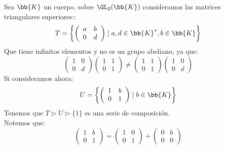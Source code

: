 \begin{ejemplo}
    Sea $\bb{K}$ un cuerpo, sobre $\GL_2(\bb{K})$ consideramos las matrices triangulares superiores::
    \begin{equation*}
        T = \left\{\left(\begin{array}{cc}
            a & b \\
            0 & d 
        \end{array}\right) \mid a,d\in \bb{K}^\ast, b\in \bb{K}\right\}
    \end{equation*}
    Que tiene infinitos elementos y no es un grupo abeliano, ya que:
    \begin{equation*}
        \left(\begin{array}{cc}
            1 & 0 \\
            0 & d 
        \end{array}\right)\left(\begin{array}{cc}
            1 & 1 \\
            0 & 1 
        \end{array}\right) \neq \left(\begin{array}{cc}
            1 & 1 \\
            0 & 1 
        \end{array}\right)\left(\begin{array}{cc}
            1 & 0 \\
            0 & d 
        \end{array}\right)
    \end{equation*}
    Si consideramos ahora:
    \begin{equation*}
        U = \left\{\left(\begin{array}{cc}
            1 & b \\
            0 & 1 
        \end{array}\right) \mid b\in \bb{K}\right\}
    \end{equation*}
    Tenemos que $T\rhd U \rhd \{1\}$ es una serie de composición.\\

    \noindent
    Notemos que:
    \begin{equation*}
        \left(\begin{array}{cc}
            1 & b \\
            0 & 1 
        \end{array}\right) = \left(\begin{array}{cc}
            1 & 0 \\
            0 & 1 
        \end{array}\right) + \left(\begin{array}{cc}
            0 & b \\
            0 & 0 
        \end{array}\right)
    \end{equation*}


\end{ejemplo}
